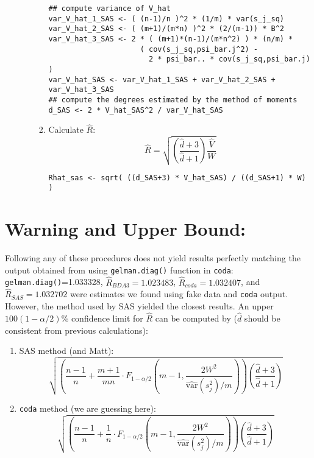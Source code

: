 \documentclass[11pt]{article}\usepackage[]{graphicx}\usepackage[]{color}
\begin{document}
\begin{enumerate}
\begin{enumerate}
\begin{enumerate}
{\color{red}
\begin{verbatim}
## compute variance of V_hat
var_V_hat_1_SAS <- ( (n-1)/n )^2 * (1/m) * var(s_j_sq)
var_V_hat_2_SAS <- ( (m+1)/(m*n) )^2 * (2/(m-1)) * B^2
var_V_hat_3_SAS <- 2 * ( (m+1)*(n-1)/(m*n^2) ) * (n/m) * 
                     ( cov(s_j_sq,psi_bar.j^2) - 
                       2 * psi_bar.. * cov(s_j_sq,psi_bar.j) )
var_V_hat_SAS <- var_V_hat_1_SAS + var_V_hat_2_SAS + var_V_hat_3_SAS
## compute the degrees estimated by the method of moments
d_SAS <- 2 * V_hat_SAS^2 / var_V_hat_SAS
\end{verbatim}
} 
    \item Calculate $\widehat{R}$:
{\color{blue}
$$\widehat{R} = \sqrt{\left(\frac{\widehat{d}+3}{\widehat{d}+1}\right)\frac{\widehat{V}}{W}}$$    
}
{\color{red}
\begin{verbatim}
Rhat_sas <- sqrt( ((d_SAS+3) * V_hat_SAS) / ((d_SAS+1) * W) )
\end{verbatim}
}    
    \end{enumerate}
    
  \end{enumerate}
\end{enumerate}

\section{Warning and Upper Bound:}
Following any of these procedures does not yield results perfectly matching the output obtained from using \verb|gelman.diag()| function in \verb|coda|: \verb|gelman.diag()|=1.033328, $\widehat{R}_{BDA3}=1.023483$, $\widehat{R}_{coda}=1.032407$, and $\widehat{R}_{SAS}=1.032702$ were estimates we found using fake data and \verb|coda| output. However, the method used by SAS yielded the closest results. An upper $100(1-\alpha/2)\%$ confidence limit for $\widehat{R}$ can be computed by ($\widehat{d}$ should be consistent from previous calculations):

\begin{enumerate}
\item SAS method (and Matt):
{\color{blue}
$$\sqrt{\left(\frac{n-1}{n}+ \frac{m+1}{mn}\cdot F_{1-\alpha/2}\left(m-1,\frac{2W^2}{\widehat{\text{var}}(s_j^2)/m}\right)\right)\left(\frac{\widehat{d}+3}{\widehat{d}+1}\right)}$$
}

\item \verb|coda| method (we are guessing here):
{\color{blue}
$$\sqrt{\left(\frac{n-1}{n}+ \frac{1}{n}\cdot F_{1-\alpha/2}\left(m-1,\frac{2W^2}{\widehat{\text{var}}(s_j^2)/m}\right)\right)\left(\frac{\widehat{d}+3}{\widehat{d}+1}\right)}$$
}

\end{enumerate}
\end{document}
